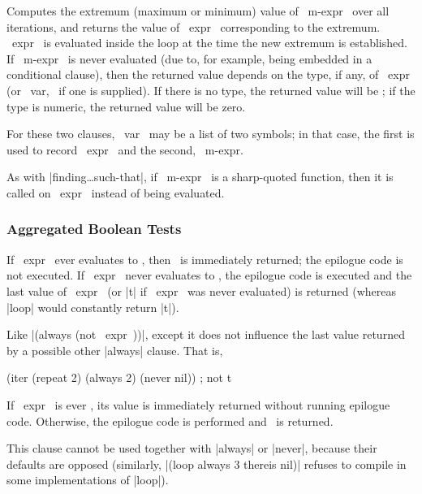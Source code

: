 \begin{clauses}
\startitem
{}
\finishitem
Computes the extremum (maximum or minimum) value of ~m-expr~ over all
iterations, and returns the value of ~expr~ corresponding to the
extremum.  ~expr~ is evaluated inside the loop at the time the new
extremum is established.  If ~m-expr~ is never evaluated (due to, for
example, being embedded in a conditional clause), then the returned
value depends on the type, if any, of ~expr~ (or ~var,~ if
one is supplied).  If there is no type, the returned
value will be \nil; if the type is numeric, the returned value will be
zero.

\cpar For these two clauses, ~var~ may be a list of two
symbols; in that case, the first is used to record ~expr~ and
the second, ~m-expr.~  

\cpar As with |finding\dots such-that|, if ~m-expr~ is a sharp-quoted
function, then it is called on ~expr~ instead of being evaluated.

\end{clauses}

\subsubsection{Aggregated Boolean Tests}

\begin{clauses}

If ~expr~ ever evaluates to
\nil, then \nil\ is immediately returned; the epilogue code is not
executed.  If ~expr~ never evaluates to \nil, the epilogue code
is executed and the last value of ~expr~ (or |t| if ~expr~ was never
evaluated) is returned (whereas |loop| would constantly return |t|).


Like |(always (not ~expr~))|, except it does not influence the last
value returned by a possible other |always| clause. That is,
\begin{program}
(iter (repeat 2)
      (always 2)
      (never nil))  ; not t
\end{program}

If ~expr~ is ever \nonnil,
its value is immediately returned without running epilogue code.
Otherwise, the epilogue code is performed and \nil\ is returned.

This clause cannot be used together with |always| or |never|, because their
defaults are opposed (similarly, |(loop always 3 thereis nil)| refuses to
compile in some implementations of |loop|).

\end{clauses}



